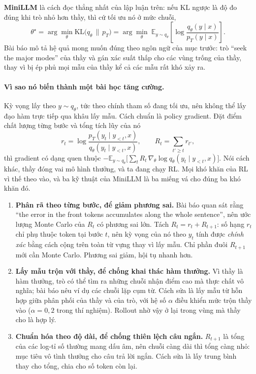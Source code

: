 \textbf{MiniLLM} \cite{gu2024minillm} là cách đọc thẳng nhất của lập luận trên: nếu KL ngược là độ đo đúng khi trò nhỏ hơn thầy, thì cứ tối ưu nó ở mức chuỗi,
\[
\theta^\star = \arg\min_\theta \mathrm{KL}\big(q_\theta \,\|\, p_T\big)
= \arg\min_\theta \; \mathbb{E}_{y\sim q_\theta}\left[\log\frac{q_\theta(y\mid x)}{p_T(y\mid x)}\right].
\]
Bài báo mô tả hệ quả mong muốn đúng theo ngôn ngữ của mục trước: trò ``seek the major modes'' của thầy và gán xác suất thấp cho các vùng trống của thầy, thay vì bị ép phủ mọi mẫu của thầy kể cả các mẫu rất khó xảy ra.

\paragraph{Vì sao nó biến thành một bài học tăng cường.} Kỳ vọng lấy theo $y\sim q_\theta$, tức theo chính tham số đang tối ưu, nên không thể lấy đạo hàm trực tiếp qua khâu lấy mẫu. Cách chuẩn là policy gradient. Đặt điểm chất lượng từng bước và tổng tích lũy của nó
\[
r_t = \log\frac{p_T(y_t\mid y_{<t},x)}{q_\theta(y_t\mid y_{<t},x)},
\qquad
R_t = \sum_{t'\ge t} r_{t'},
\]
thì gradient có dạng quen thuộc $-\mathbb{E}_{y\sim q_\theta}\big[\sum_t R_t\,\nabla_\theta \log q_\theta(y_t\mid y_{<t},x)\big]$. Nói cách khác, thầy đóng vai mô hình thưởng, và ta đang chạy RL. Mọi khó khăn của RL vì thế theo vào, và ba kỹ thuật của MiniLLM là ba miếng vá cho đúng ba khó khăn đó.

\begin{enumerate}
	\item \textbf{Phân rã theo từng bước, để giảm phương sai.} Bài báo quan sát rằng ``the error in the front tokens accumulates along the whole sentence'', nên ước lượng Monte Carlo của $R_t$ có phương sai lớn. Tách $R_t = r_t + R_{t+1}$: số hạng $r_t$ chỉ phụ thuộc token tại bước $t$, nên kỳ vọng của nó theo $y_t$ tính được \emph{chính xác} bằng cách cộng trên toàn từ vựng thay vì lấy mẫu. Chỉ phần đuôi $R_{t+1}$ mới cần Monte Carlo. Phương sai giảm, hội tụ nhanh hơn.
	\item \textbf{Lấy mẫu trộn với thầy, để chống khai thác hàm thưởng.} Vì thầy là hàm thưởng, trò có thể tìm ra những chuỗi nhận điểm cao mà thực chất vô nghĩa; bài báo nêu ví dụ các chuỗi lặp cụm từ. Cách sửa là lấy mẫu từ hỗn hợp giữa phân phối của thầy và của trò, với hệ số $\alpha$ điều khiển mức trộn thầy vào ($\alpha = 0{,}2$ trong thí nghiệm). Rollout nhờ vậy ở lại trong vùng mà thầy cho là hợp lý.
	\item \textbf{Chuẩn hóa theo độ dài, để chống thiên lệch câu ngắn.} $R_{t+1}$ là tổng của các log-tỉ số thường mang dấu âm, nên chuỗi càng dài thì tổng càng nhỏ: mục tiêu vô tình thưởng cho câu trả lời ngắn. Cách sửa là lấy trung bình thay cho tổng, chia cho số token còn lại.
\end{enumerate}

